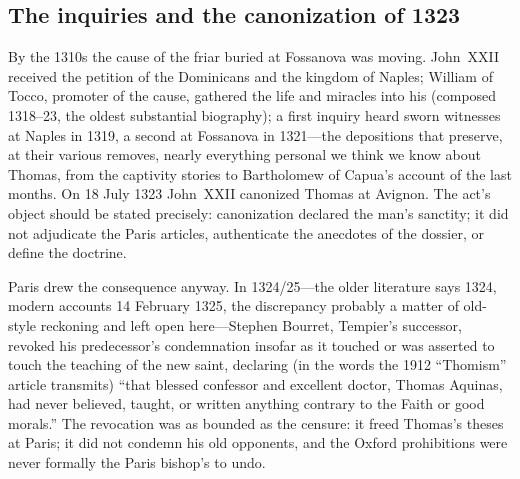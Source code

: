 \subsection{The inquiries and the canonization of 1323}

By the 1310s the cause of the friar buried at Fossanova was moving.
John~XXII received the petition of the Dominicans and the kingdom of
Naples; William of Tocco, promoter of the cause, gathered the life and
miracles into his  (composed
1318--23, the oldest substantial biography); a first inquiry heard sworn
witnesses at Naples in 1319, a second at Fossanova in 1321---the
depositions that preserve, at their various removes, nearly everything
personal we think we know about Thomas, from the captivity stories to
Bartholomew of Capua's account of the last months. On 18 July 1323
John~XXII canonized Thomas at Avignon. The act's object should be
stated precisely: canonization declared the man's sanctity; it did not
adjudicate the Paris articles, authenticate the anecdotes of the
dossier, or define the doctrine.

Paris drew the consequence anyway. In 1324/25---the older literature
says 1324, modern accounts 14 February 1325, the discrepancy probably a
matter of old-style reckoning and left open here---Stephen Bourret,
Tempier's successor, revoked his predecessor's condemnation insofar as
it touched or was asserted to touch the teaching of the new saint,
declaring (in the words the 1912 ``Thomism'' article transmits) ``that
blessed confessor and excellent doctor, Thomas Aquinas, had never
believed, taught, or written anything contrary to the Faith or good
morals.'' The revocation was as bounded as the censure: it freed
Thomas's theses at Paris; it did not condemn his old opponents, and the
Oxford prohibitions were never formally the Paris bishop's to undo.
